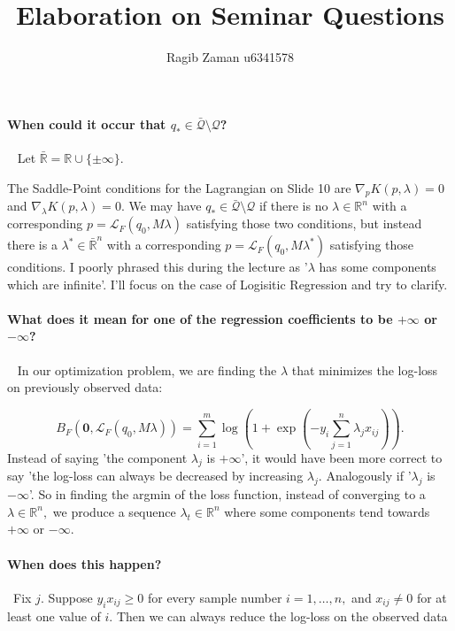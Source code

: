 \documentclass[a4paper,12pt]{article}
\title{Elaboration on Seminar Questions}
\author{Ragib Zaman u6341578}
\begin{document}
\maketitle

\paragraph{When could it occur that $q_* \in \bar{\mathcal{Q}}\setminus \mathcal{Q}$? }
\
\newline
Let $\bar{\mathbb{R}} = \mathbb{R} \cup \{ \pm \infty\}.$ 

The Saddle-Point conditions for the Lagrangian on Slide 10 are $\nabla_p K(p, \lambda)=0$ and $\nabla_{\lambda} K(p,\lambda)=0.$ We may have $q_* \in \bar{\mathcal{Q}}\setminus \mathcal{Q}$ if there is no $\lambda \in \mathbb{R}^n$ with a corresponding $p = \mathcal{L}_F(q_0, M\lambda)$ satisfying those two conditions, but instead there is a $\lambda^* \in \bar{\mathbb{R}}^n$ with a corresponding $p= \mathcal{L}_F(q_0, M\lambda^*)$ satisfying those conditions. I poorly phrased this during the lecture as  '$\lambda$ has some components which are infinite'. I'll focus on the case of Logisitic Regression and try to clarify. 

\paragraph{What does it mean for one of the regression coefficients to be $+\infty$ or $-\infty$?}
\
\newline
In our optimization problem, we are finding the $\lambda$ that minimizes the log-loss on previously observed data:

$$ B_F(\mathbf{0}, \mathcal{L}_F(q_0, M\lambda)) = \sum_{i=1}^m \log\left(1+\exp\left( -y_i \sum_{j=1}^n \lambda_j x_{ij}\right)\right).$$ Instead of saying 'the component $\lambda_j$ is $+\infty$', it would have been more correct to say 'the log-loss can always be decreased by increasing $\lambda_j.$ Analogously if '$\lambda_j$ is $-\infty$'. So in finding the argmin of the loss function, instead of converging to a $\lambda \in \mathbb{R}^n,$ we produce a sequence $\lambda_t \in \mathbb{R}^n$ where some components tend towards $+\infty$ or $-\infty.$  
\paragraph{When does this happen?}
\
Fix $j.$ Suppose $y_i x_{ij} \geq 0$ for every sample number $i=1,\ldots, n,$ and $x_{ij}\neq 0$ for at least one value of $i.$ Then we can always reduce the log-loss on the observed data
\end{document}
